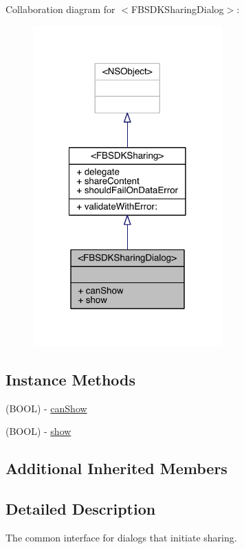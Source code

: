 Collaboration diagram for $<$F\-B\-S\-D\-K\-Sharing\-Dialog$>$\-:
\nopagebreak
\begin{figure}[H]
\begin{center}
\leavevmode
\includegraphics[width=206pt]{protocol_f_b_s_d_k_sharing_dialog-p__coll__graph}
\end{center}
\end{figure}
\subsection*{Instance Methods}
\begin{DoxyCompactItemize}
\item 
(B\-O\-O\-L) -\/ \hyperlink{protocol_f_b_s_d_k_sharing_dialog-p_a68ec3b22db7bf5b908fdc12438d38159}{can\-Show}
\item 
(B\-O\-O\-L) -\/ \hyperlink{protocol_f_b_s_d_k_sharing_dialog-p_a442b2571fe59477a403a9e14a7e9c1f6}{show}
\end{DoxyCompactItemize}
\subsection*{Additional Inherited Members}


\subsection{Detailed Description}
The common interface for dialogs that initiate sharing. 

